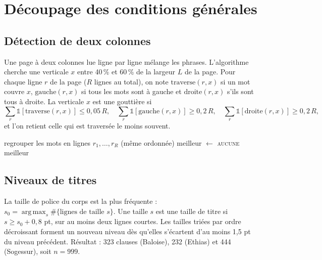 \documentclass[11pt,a4paper]{article}
\DeclareMathOperator*{\argmax}{arg\,max}
\begin{document}
\section{Découpage des conditions générales}

\subsection{Détection de deux colonnes}
Une page à deux colonnes lue ligne par ligne mélange les phrases. L'algorithme cherche une
verticale $x$ entre 40\,\% et 60\,\% de la largeur $L$ de la page. Pour chaque ligne $r$ de la
page ($R$ lignes au total), on note $\mathrm{traverse}(r,x)$ si un mot couvre $x$, $\mathrm{gauche}(r,x)$
si tous les mots sont à gauche et $\mathrm{droite}(r,x)$ s'ils sont tous à droite. La verticale $x$ est
une gouttière si
\[
\sum_r \mathbb{1}[\mathrm{traverse}(r,x)] \le 0{,}05\,R,\quad
\sum_r \mathbb{1}[\mathrm{gauche}(r,x)] \ge 0{,}2\,R,\quad
\sum_r \mathbb{1}[\mathrm{droite}(r,x)] \ge 0{,}2\,R,
\]
et l'on retient celle qui est traversée le moins souvent.

\begin{algorithm}[h]
\caption{Gouttière centrale d'une page}
regrouper les mots en lignes $r_1,\dots,r_R$ (même ordonnée)\;
meilleur $\leftarrow$ \textsc{aucune}\;
\Return meilleur\;
\end{algorithm}

\subsection{Niveaux de titres}
La taille de police du corps est la plus fréquente : $s_0 = \argmax_s \#\{\text{lignes de taille } s\}$.
Une taille $s$ est une taille de titre si $s \ge s_0 + 0{,}8$ pt, sur au moins deux lignes courtes.
Les tailles triées par ordre décroissant forment un nouveau niveau dès qu'elles s'écartent d'au
moins 1,5 pt du niveau précédent. Résultat : 323 clauses (Baloise), 232 (Ethias) et 444 (Sogessur),
soit $n = 999$.

\end{document}

